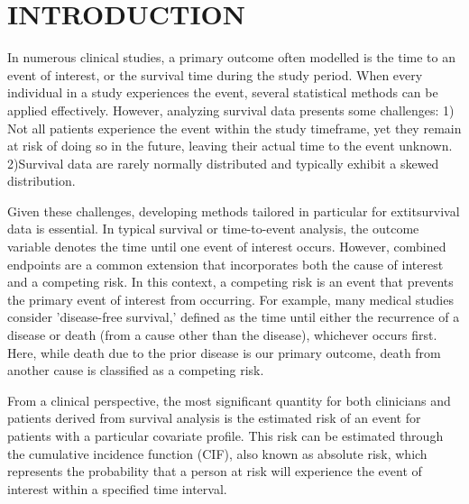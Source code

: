 \documentclass[AMA,Times1COL]{WileyNJDv5} %
\begin{document}



\maketitle

\renewcommand\thefootnote{}

\renewcommand\thefootnote{\fnsymbol{footnote}}
\setcounter{footnote}{1}

\section{INTRODUCTION}\label{sec1}

In numerous clinical studies, a primary outcome often modelled is the time to an event of interest, or the survival time during the study period. When every individual in a study experiences the event, several statistical methods can be applied effectively. However, analyzing survival data presents some challenges: 1) Not all patients experience the event within the study timeframe, yet they remain at risk of doing so in the future, leaving their actual time to the event unknown. 2)Survival data are rarely normally distributed and typically exhibit a skewed distribution.

Given these challenges, developing methods tailored in particular for extit{survival data} is essential. In typical survival or time-to-event analysis, the outcome variable denotes the time until one event of interest occurs. However, combined endpoints are a common extension that incorporates both the cause of interest and a competing risk. In this context, a competing risk is an event that prevents the primary event of interest from occurring. For example, many medical studies consider 'disease-free survival,' defined as the time until either the recurrence of a disease or death (from a cause other than the disease), whichever occurs first. Here, while death due to the prior disease is our primary outcome, death from another cause is classified as a competing risk.

From a clinical perspective, the most significant quantity for both clinicians and patients derived from survival analysis is the estimated risk of an event for patients with a particular covariate profile. This risk can be estimated through the cumulative incidence function (CIF), also known as absolute risk, which represents the probability that a person at risk will experience the event of interest within a specified time interval.
\end{document}
